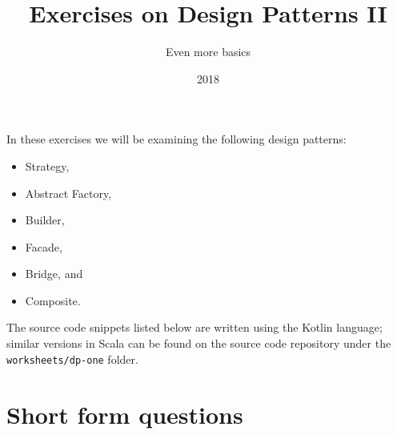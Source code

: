 \documentclass[12pt,a4paper]{exam}
\title{Exercises on Design Patterns II}
\author{Even more basics}
\date{2018}
\begin{document}
\maketitle

In these exercises we will be examining the following design patterns:
\begin{itemize}
\item Strategy,
\item Abstract Factory,
\item Builder,
\item Facade,
\item Bridge, and
\item Composite.
\end{itemize}
The source code snippets listed below are written using the Kotlin language; 
similar versions in Scala can be found on the source 
code repository under the \verb!worksheets/dp-one! folder. 

\section*{Short form questions}
\end{document}
